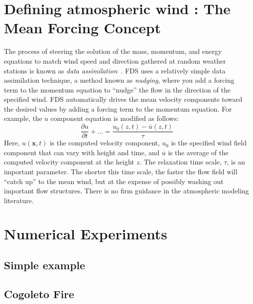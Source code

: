 \documentclass[journal,article,atmosphere,submit,moreauthors,pdftex]{Definitions/mdpi}
\begin{document}
\section{Defining atmospheric wind : The Mean Forcing Concept} \label{sec:wind}

The process of steering the solution of the mass, momentum, and energy equations to match wind speed and direction gathered at random weather stations is known as \emph{data assimilation}~\cite{Kalnay:2003}. FDS uses a relatively simple data assimilation technique, a method known as \emph{nudging}, where you add a forcing term to the momentum equation to ``nudge'' the flow in the direction of the specified wind. FDS automatically drives the mean velocity components toward the desired values by adding a forcing term to the momentum equation. For example, the $u$ component equation is modified as follows:
\begin{equation}
   \frac{\partial u}{\partial t} + \ldots = \frac{u_0(z,t)-\overline{u}(z,t)}{\tau} \label{mean_forcing_u}
\end{equation}
Here, $u(\mathbf{x},t)$ is the computed velocity component, $u_0$ is the specified wind field component that can vary with height and time, and $\overline{u}$ is the average of the computed velocity component at the height $z$. The relaxation time scale, $\tau$, is an important parameter. The shorter this time scale, the faster the flow field will ``catch up'' to the mean wind, but at the expense of possibly washing out important flow structures. There is no firm guidance in the atmospheric modeling literature.


\section{Numerical Experiments} \label{sec:numexp}





\subsection{Simple example}  \label{sec:simexp}




\subsection{Cogoleto Fire}  \label{sec:cogo}
\end{document}

